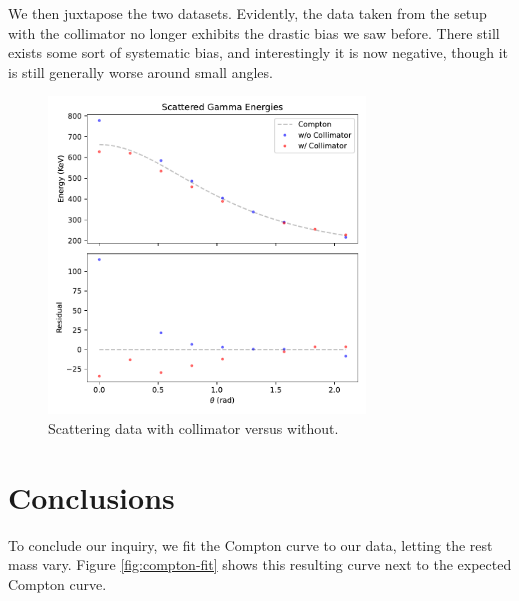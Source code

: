 \documentclass[12pt, letterpaper]{article}
\begin{document}
We then juxtapose the two datasets. Evidently, the data taken from the setup with the collimator no longer exhibits the drastic bias we saw before. There still exists some sort of systematic bias, and interestingly it is now negative, though it is still generally worse around small angles. 

\begin{figure}[!h]
    \centering
    \includegraphics[width=0.75\textwidth]{experiment2/figures/pmt_saturation.pdf}
    \caption{Scattering data with collimator versus without. }
    \label{fig:pmt-saturation}
\end{figure}

\section{Conclusions}

To conclude our inquiry, we fit the Compton curve to our data, letting the rest mass vary. Figure \ref{fig:compton-fit} shows this resulting curve next to the expected Compton curve. 
\end{document}
